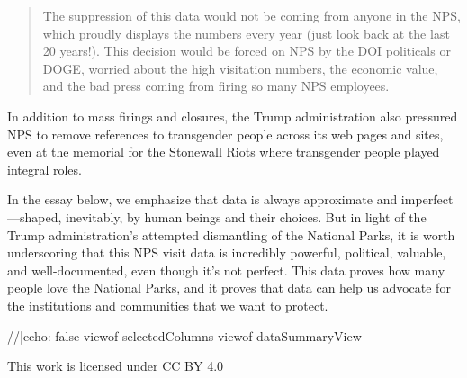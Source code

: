 \documentclass[
  letterpaper,
  DIV=11,
  numbers=noendperiod]{scrartcl}
\newenvironment{Shaded}{\begin{snugshade}}{\end{snugshade}}
\newcommand{\NormalTok}[1]{\textcolor[rgb]{0.00,0.23,0.31}{#1}}
\begin{document}
\begin{quote}
The suppression of this data would not be coming from anyone in the NPS,
which proudly displays the numbers every year (just look back at the
last 20 years!). This decision would be forced on NPS by the DOI
politicals or DOGE, worried about the high visitation numbers, the
economic value, and the bad press coming from firing so many NPS
employees.
\end{quote}

In addition to mass firings and closures, the Trump administration also
pressured NPS to remove references to transgender people across its web
pages and sites, even at the memorial for the Stonewall Riots where
transgender people played integral roles.~

In the essay below, we emphasize that data is always approximate and
imperfect---shaped, inevitably, by human beings and their choices. But
in light of the Trump administration's attempted dismantling of the
National Parks, it is worth underscoring that this NPS visit data is
incredibly powerful, political, valuable, and well-documented, even
though it's not perfect. This data proves how many people love the
National Parks, and it proves that data can help us advocate for the
institutions and communities that we want to protect.

\begin{tcolorbox}[enhanced jigsaw, title={View Summary of Columns}, breakable, bottomrule=.15mm, coltitle=black, toprule=.15mm, opacitybacktitle=0.6, arc=.35mm, colback=white, leftrule=.75mm, colbacktitle=quarto-callout-note-color!10!white, left=2mm, bottomtitle=1mm, opacityback=0, toptitle=1mm, colframe=quarto-callout-note-color-frame, titlerule=0mm, rightrule=.15mm]

\begin{Shaded}
\begin{Highlighting}[]
\NormalTok{//|echo: false}
\NormalTok{viewof selectedColumns}
\NormalTok{viewof dataSummaryView}
\end{Highlighting}
\end{Shaded}

\end{tcolorbox}

\begin{tcolorbox}[enhanced jigsaw, title={Creative Commons License}, breakable, bottomrule=.15mm, coltitle=black, toprule=.15mm, opacitybacktitle=0.6, arc=.35mm, colback=white, leftrule=.75mm, colbacktitle=quarto-callout-tip-color!10!white, left=2mm, bottomtitle=1mm, opacityback=0, toptitle=1mm, colframe=quarto-callout-tip-color-frame, titlerule=0mm, rightrule=.15mm]

This work is licensed under CC BY 4.0

\end{tcolorbox}
\end{document}
